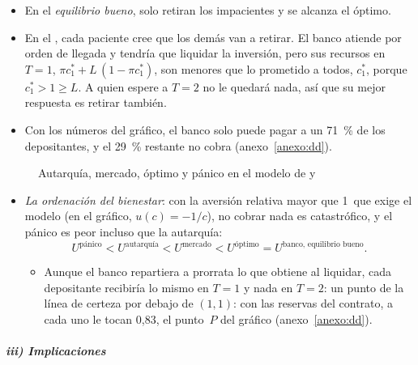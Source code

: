 \documentclass[11pt]{article}
\begin{document}
\begin{itemize}
  \begin{itemize}
  \item En el \emph{equilibrio bueno}, solo retiran los impacientes y se alcanza el óptimo.
  \item En el , cada paciente cree que los demás van a retirar. El banco atiende por orden de llegada y tendría que liquidar la inversión, pero sus recursos en $T=1$, $\pi c_1^*+L\,(1-\pi c_1^*)$, son menores que lo prometido a todos, $c_1^*$, porque $c_1^*>1\geq L$. A quien espere a $T=2$ no le quedará nada, así que su mejor respuesta es retirar también.
  \item Con los números del gráfico, el banco solo puede pagar a un 71~\% de los depositantes, y el 29~\% restante no cobra (anexo~\ref{anexo:dd}).
  \end{itemize}
\end{itemize}

\begin{figure}[H]
\centering
\caption{Autarquía, mercado, óptimo y pánico en el modelo de  y }\label{fig:diamond-dybvig}
\end{figure}

\begin{itemize}
\item \emph{La ordenación del bienestar}: con la aversión relativa mayor que 1~que exige el modelo (en el gráfico, $u(c)=-1/c$), no cobrar nada es catastrófico, y el pánico es peor incluso que la autarquía:
  \begin{equation}\label{eq:dd-orden}
  U^{\text{pánico}}<U^{\text{autarquía}}<U^{\text{mercado}}<U^{\text{óptimo}}=U^{\text{banco, equilibrio bueno}}.
  \end{equation}
  \begin{itemize}
  \item Aunque el banco repartiera a prorrata lo que obtiene al liquidar, cada depositante recibiría lo mismo en $T=1$ y nada en $T=2$: un punto de la línea de certeza por debajo de $(1,1)$: con las reservas del contrato, a cada uno le tocan 0,83, el punto~$P$ del gráfico (anexo~\ref{anexo:dd}).
  \end{itemize}
\end{itemize}

\subparagraph{iii) Implicaciones}
\end{document}
